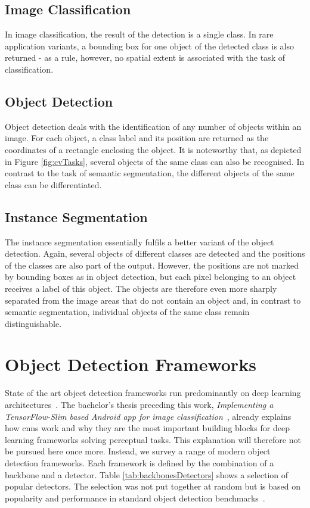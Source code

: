 \documentclass[
			   fontsize=11pt,
               paper=a4,
               bibliography=totoc,
               idxtotoc,
               headsepline,
               footsepline,
               footinclude=false,
               BCOR=12mm,
               DIV=13,
               openany,   %
               ]
               {scrbook}
\begin{document}
\subsection{Image Classification}
In image classification, the result of the detection is a single class. In rare application variants, a bounding box for one object of the detected class is also returned - as a rule, however, no spatial extent is associated with the task of classification.

\subsection{Object Detection}
Object detection deals with the identification of any number of objects within an image. For each object, a class label and its position are returned as the coordinates of a rectangle enclosing the object. It is noteworthy that, as depicted in Figure \autoref{fig:cvTasks}, several objects of the same class can also be recognised. In contrast to the  task of semantic segmentation, the different objects of the same class can be differentiated.

\subsection{Instance Segmentation}
The instance segmentation essentially fulfils a better variant of the object detection. Again, several objects of different classes are detected and the positions of the classes are also part of the output. However, the positions are not marked by bounding boxes as in object detection, but each pixel belonging to an object receives a label of this object. The objects are therefore even more sharply separated from the image areas that do not contain an object and, in contrast to semantic segmentation, individual objects of the same class remain distinguishable.

\section{Object Detection Frameworks}

State of the art object detection frameworks run predominantly on deep learning architectures~\cite{dlForDetection}. The bachelor's thesis preceding this work, \textit{Implementing a TensorFlow-Slim based Android app for image classification}~\cite{maxJokel}, already explains how \glspl{cnn} work and why they are the most important building blocks for deep learning frameworks solving perceptual tasks. This explanation will therefore not be pursued here once more. Instead, we survey a range of modern object detection frameworks. Each framework is defined by the combination of a backbone and a detector. Table \autoref{tab:backbonesDetectors} shows a selection of popular detectors. The selection was not put together at random but is based on popularity and performance in standard object detection benchmarks~\cite{backbones}. 
\end{document}
